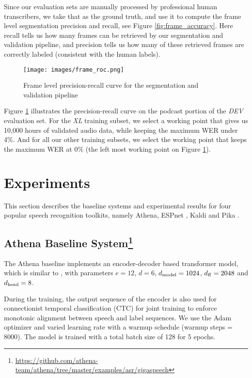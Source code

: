 \documentclass[a4paper]{article}
\begin{document}
Since our evaluation sets are manually processed by professional human transcribers,
we take that as the ground truth, and use it to compute the frame level segmentation
precision and recall, see Figure \ref{fig:frame_accuracy}. Here recall tells us
how many frames can be retrieved by our segmentation and validation pipeline, and
precision tells us how many of these retrieved frames are correctly labeled (consistent
with the human labels).

\begin{figure}[t]
  \centering
  \texttt{[image: images/frame\_roc.png]}
  \vspace{-6ex}
  \caption{Frame level precision-recall curve for the segmentation and validation pipeline}
  \vspace{-4ex}
  \label{fig:frame_roc}
\end{figure}

Figure \ref{fig:frame_roc} illustrates the precision-recall curve on the podcast
portion of the {\it DEV} evaluation set. For the {\it XL} training subset, we
select a working point that gives us 10,000 hours of validated audio data, while
keeping the maximum WER under 4\%. And for all our other training subsets, we
select the working point that keeps the maximum WER at 0\% (the left most
working point on Figure \ref{fig:frame_roc}).

\section{Experiments}
This section describes the baseline systems and experimental results for four popular speech recognition
toolkits, namely Athena, ESPnet \cite{Watanabe2018ESPnet},
Kaldi \cite{povey2011kaldi} and Pika \cite{Weng2020}.

\subsection[Athena Baseline System]{Athena Baseline System\footnote{\url{https://github.com/athena-team/athena/tree/master/examples/asr/gigaspeech}}\label{foot:athena}}
The Athena baseline implements an encoder-decoder based transformer model, which
is similar to \cite{karita2019comparative}, with parameters
$e=12$, $d=6$, $d_{\rm model}=1024$, $d_{\rm ff}=2048$ and $d_{\rm head}=8$.

During the training, the output sequence of the encoder is also used for
connectionist temporal classification (CTC) for joint training to enforce
monotonic alignment between speech and label sequences. We use the Adam
optimizer and varied learning rate with a warmup schedule (warmup steps = 8000).
The model is trained with a total batch size of 128 for 5 epochs.
\end{document}
